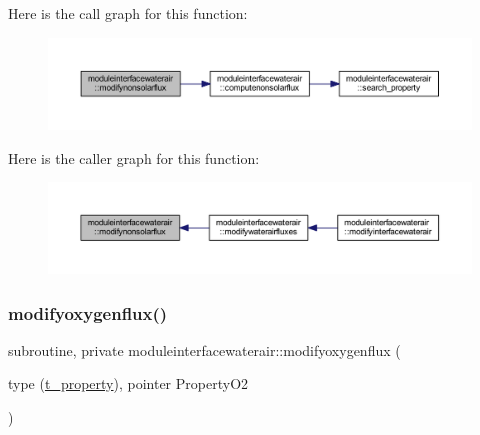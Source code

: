 Here is the call graph for this function\+:\nopagebreak
\begin{figure}[H]
\begin{center}
\leavevmode
\includegraphics[width=350pt]{namespacemoduleinterfacewaterair_a9ae768b301ebc2c73524836b992b568d_cgraph}
\end{center}
\end{figure}
Here is the caller graph for this function\+:\nopagebreak
\begin{figure}[H]
\begin{center}
\leavevmode
\includegraphics[width=350pt]{namespacemoduleinterfacewaterair_a9ae768b301ebc2c73524836b992b568d_icgraph}
\end{center}
\end{figure}
\mbox{\label{namespacemoduleinterfacewaterair_ad4e148f79fe842f02dfc2fd7eb424091}} 
\subsubsection{\texorpdfstring{modifyoxygenflux()}{modifyoxygenflux()}}
{\footnotesize\ttfamily subroutine, private moduleinterfacewaterair\+::modifyoxygenflux (\begin{DoxyParamCaption}\item[{type (\mbox{\hyperlink{structmoduleinterfacewaterair_1_1t__property}{t\+\_\+property}}), pointer}]{Property\+O2 }\end{DoxyParamCaption})\hspace{0.3cm}{\ttfamily [private]}}

